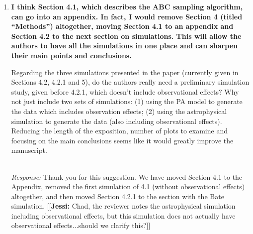 \documentclass[11pt, oneside]{article}   	%
\newcommand{\jessi}[1]{{\color{blue}[[\textbf{Jessi: }#1]]}}
\begin{document}
\begin{enumerate}
\item {\bf I think Section 4.1, which describes the ABC sampling algorithm, can go into an appendix. In fact, I would remove Section 4 (titled ``Methods'') altogether, moving Section 4.1 to an appendix and Section 4.2 to the next section on simulations. This will allow the authors to have all the simulations in one place and can sharpen their main points and conclusions.

Regarding the three simulations presented in the paper (currently given in Sections 4.2, 4.2.1 and 5), do the authors really need a preliminary simulation study, given before 4.2.1, which doesn't include observational effects? Why not just include two sets of simulations: (1) using the PA model to generate the data which includes observation effects; (2) using the astrophysical simulation to generate the data (also including observational effects). Reducing the length of the exposition, number of plots to examine and focusing on the main conclusions seems like it would greatly improve the manuscript.
}\\
\noindent \emph{Response:} Thank you for this suggestion.  We have moved Section 4.1 to the Appendix, removed the first simulation of 4.1 (without observational effects) altogether, and then moved Section 4.2.1 to the section with the Bate simulation.  
\jessi{Chad, the reviewer notes the astrophysical simulation including observational effects, but this simulation does not actually have observational effects...should we clarify this?}
\bigskip
\end{enumerate}
\end{document}
